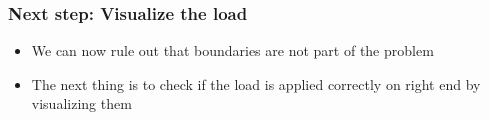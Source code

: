 \documentclass{beamer}
\begin{document}
 \begin{frame}
\frametitle{Next step: Visualize the load}
\begin{itemize}
		\vfill
		\item{We can now rule out that boundaries are not part of the problem}
		\vfill
		\item{The next thing is to check if the load is applied correctly on right end by visualizing them}
		\vfill
\end{itemize}
\end{frame}
\end{document}
